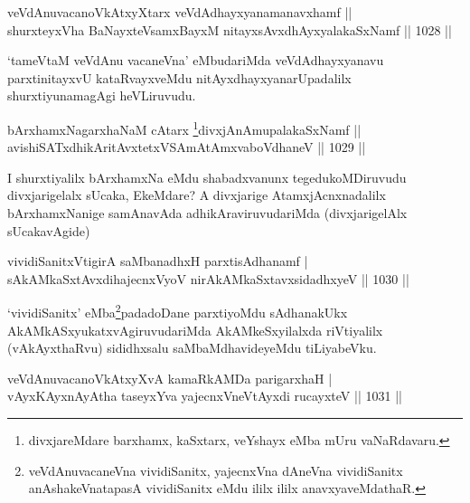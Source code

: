 \begin{shl}
veVdAnuvacanoVkAtxyX\s tarx veVdAdhayxyanamanavxhamf || \\
shurxteyxVha BaNayxteV\s samxBayxM nitayxsAvxdhAyxyalakaSxNamf \hfill || 1028 ||  
\end{shl}

\begin{artha}
`tameVtaM veVdAnu vacaneVna' eMbudariMda veVdAdhayxyanavu parxtinitayxvU kataRvayxveMdu nitAyxdhayxyanarUpadalilx shurxtiyunamagAgi heVLiruvudu.
\end{artha}


\begin{shl}
bArxhamxNagarxhaNaM cAtarx \footnote{divxjareMdare barxhamx, kaSxtarx, veYshayx eMba mUru vaNaRdavaru.}divxjAnAmupalakaSxNamf || \\
avishiSATxdhikAritAvxtetxVSAmAtAmxvaboVdhaneV \hfill || 1029 ||  
\end{shl}

\begin{artha}
I shurxtiyalilx bArxhamxNa eMdu shabadxvanunx tegedukoMDiruvudu divxjarigelalx sUcaka, EkeMdare? A divxjarige AtamxjAcnxnadalilx bArxhamxNanige samAnavAda adhikAraviruvudariMda (divxjarigelAlx sUcakavAgide)
\end{artha}


\begin{shl}
vividiSanitxVtigirA saMbanadhxH parxtisAdhanamf |\\
sAkAMkaSxtAvxdihajecnxVyoV nirAkAMkaSxtavxsidadhxyeV \hfill || 1030 ||
\end{shl}

\begin{artha}
`vividiSanitx' eMba\footnote{veVdAnuvacaneVna vividiSanitx, yajecnxVna dAneVna vividiSanitx anAshakeVnatapasA vividiSanitx eMdu ililx ililx anavxyaveMdathaR.}padadoDane parxtiyoMdu sAdhanakUkx AkAMkASxyukatxvAgiruvudariMda AkAMkeSxyilalxda riVtiyalilx (vAkAyxthaRvu) sididhxsalu saMbaMdhavideyeMdu tiLiyabeVku.
\end{artha}


\begin{shl}
veVdAnuvacanoVkAtxyXvA kamaRkAMDa parigarxhaH |\\
vAyxKAyxnAyAtha taseyxYva yajecnxVneVtAyxdi rucayxteV \hfill || 1031 ||
\end{shl}

